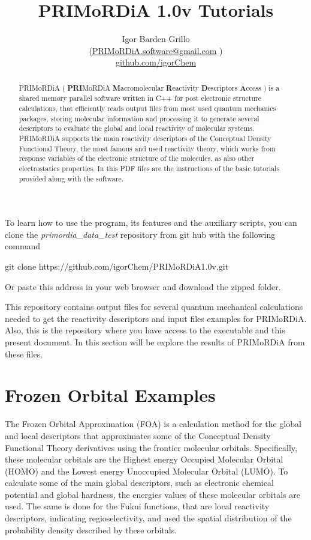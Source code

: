 \documentclass[a4paper,11pt]{refart}
\title{PRIMoRDiA 1.0v Tutorials}
\author{Igor Barden Grillo \\(\url{PRIMoRDiA.software@gmail.com} )\\\url{github.com/igorChem}}
\begin{document}
	\maketitle
	
\begin{abstract}
	PRIMoRDiA ( \textbf{PRI}MoRDiA \textbf{M}acromolecular \textbf{R}eactivity \textbf{D}escriptors \textbf{A}ccess ) is a shared memory parallel software written in C++ for post electronic structure calculations, that efficiently reads output files from most used quantum mechanics packages, storing molecular information and processing it to generate several descriptors to evaluate the global and local reactivity of molecular systems. PRIMoRDiA supports the main reactivity descriptors of the Conceptual Density Functional Theory, the most famous and used reactivity theory, which works from response variables of the electronic structure of the molecules, as also other electrostatics properties.
	In this PDF files are the instructions of the basic tutorials provided along with the software. 
	
\end{abstract}



To learn how to use the program, its features and the auxiliary scripts, you can clone the \emph{primordia\_data\_test} repository from git hub with the following command

\hspace*{-\leftmarginwidth}
\begin{minipage}{\fullwidth}
	\begin{commandshell}git clone https://github.com/igorChem/PRIMoRDiA1.0v.git\end{commandshell}
\end{minipage}

Or paste this address in your web browser and download the zipped folder.

This repository contains output files for several quantum mechanical calculations needed to get the reactivity descriptors and input files examples for PRIMoRDiA. Also, this is the repository where you have access to the executable and this present document. In this section will be explore the results of PRIMoRDiA from these files.


\section{Frozen Orbital Examples}

The Frozen Orbital Approximation (FOA) is a calculation method for the global and local descriptors that approximates some of the Conceptual Density Functional Theory derivatives using the frontier molecular orbitals. Specifically, these molecular orbitals are the Highest energy Occupied Molecular Orbital (HOMO) and the Lowest energy Unoccupied Molecular Orbital (LUMO). To calculate some of the main global descriptors, such as electronic chemical potential and global hardness, the energies values of these molecular orbitals are used. The same is done for the Fukui functions, that are local reactivity descriptors, indicating regioselectivity, and used the spatial distribution of the probability density described by these orbitals. 
\end{document}

